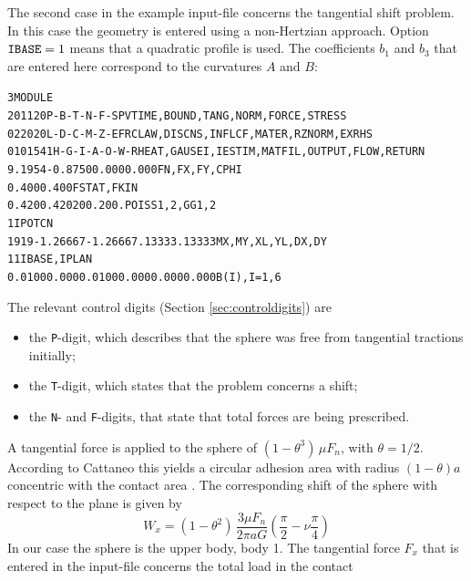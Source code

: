 \documentclass[12pt]{report}
\begin{document}
The second case in the example input-file concerns the tangential shift
problem. In this case the geometry is entered using a non-Hertzian approach.
Option ${\tt IBASE}=1$ means that a quadratic profile is used. The
coefficients $b_1$ and $b_3$ that are entered here correspond to the
curvatures $A$ and $B$:
\begin{alltt}\small

 3  MODULE
  201120     P-B-T-N-F-S        PVTIME, BOUND , TANG  , NORM , FORCE, STRESS
  022020     L-D-C-M-Z-E        FRCLAW, DISCNS, INFLCF, MATER, RZNORM, EXRHS
 0101541   H-G-I-A-O-W-R  HEAT, GAUSEI, IESTIM, MATFIL, OUTPUT, FLOW, RETURN
  9.1954     -0.8750       0.000       0.000         FN, FX, FY, CPHI
  0.400       0.400                                  FSTAT, FKIN
  0.420       0.420          200.        200.        POISS 1,2,  GG 1,2
    1                                                IPOTCN
   19   19  -1.26667  -1.26667   .13333     .13333   MX,MY,XL,YL,DX,DY
    1    1                                           IBASE, IPLAN
  0.0100    0.000     0.0100    0.000     0.000     0.000     B(I), I=1, 6
\end{alltt}
The relevant control digits (Section \ref{sec:controldigits}) are
\begin{itemize}
\item the {\tt P}-digit, which describes that the sphere was free from
        tangential tractions initially;
\item the {\tt T}-digit, which states that the problem concerns a shift;
\item the {\tt N}- and {\tt F}-digits, that state that total forces are
        being prescribed.
\end{itemize}
A tangential force is applied to the sphere of $(1-\theta^3)\,\mu F_n$,
with $\theta=1/2$. According to Cattaneo this yields a circular adhesion
area with radius $(1-\theta)a$ concentric with the contact area \cite[sec.
5.2.1.1]{Kalker1990}. The corresponding shift of the sphere with respect
to the plane is given by
\begin{equation}
        W_x = (1-\theta^2) \, \frac{3\mu F_n}{2\pi a G}
        \left( \frac{\pi}{2} - \nu \frac{\pi}{4} \right)
\end{equation}
In our case the sphere is the upper body, body 1. The tangential force $F_x$
that is entered in the input-file concerns the total load in the contact
\end{document}
